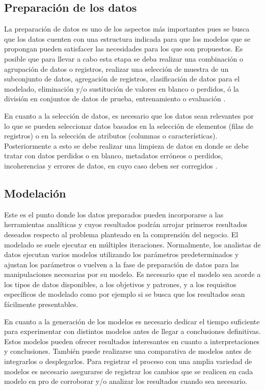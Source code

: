 \subsection{Preparación de los datos}
La preparación de datos es uno de los aspectos más importantes pues se busca que los datos cuenten con una estructura indicada para que los modelos que se propongan pueden satisfacer las necesidades para los que son propuestos. Es posible que para llevar a cabo esta etapa se deba realizar una combinación o agrupación de datos o registros, realizar una selección de muestra de un subconjunto de datos, agregación de registros, clasificación de datos para el modelado, eliminación y/o sustitución de valores en blanco o perdidos, ó la división en conjuntos de datos de prueba, entrenamiento o evaluación \cite{ibmcrisp}.

En cuanto a la selección de datos, es necesario que los datos sean relevantes por lo que se pueden seleccionar datos basados en la selección de elementos (filas de registros) o en la selección de atributos (columnas o características). Posteriormente a esto se debe realizar una limpieza de datos en donde se debe tratar con datos perdidos o en blanco, metadatos erróneos o perdidos, incoherencias y errores de datos, en cuyo caso deben ser corregidos \cite{ibmcrisp}.

\subsection{Modelación}

Este es el punto donde los datos preparados pueden incorporarse a las herramientas analíticas y cuyos resultados podrán arrojar primeros resultados deseados respecto al problema planteado en la comprensión del negocio. El modelado se suele ejecutar en múltiples iteraciones. Normalmente, los analistas de datos ejecutan varios modelos utilizando los parámetros predeterminados y ajustan los parámetros o vuelven a la fase de preparación de datos para las manipulaciones necesarias por su modelo. Es necesario que el modelo sea acorde a los tipos de datos disponibles, a los objetivos y patrones, y a los requisitos específicos de modelado como por ejemplo si se busca que los resultados sean fácilmente presentables.

En cuanto a la generación de los modelos es necesario dedicar el tiempo suficiente para experimentar con distintos modelos antes de llegar a conclusiones definitivas. Estos modelos pueden ofrecer resultados interesantes en cuanto a interpretaciones y conclusiones. También puede realizarse una comparativa de modelos antes de integrarlos o desplegarlos. Para registrar el proceso con una amplia variedad de modelos es necesario asegurarse de registrar los cambios que se realicen en cada modelo en pro de corroborar y/o analizar los resultados cuando sea necesario.

